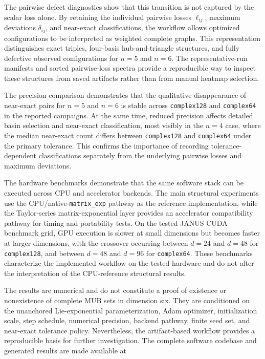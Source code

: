 \documentclass[a4paper,twocolumn,11pt,amsfonts,amssymb]{quantumarticle}
\begin{document}
The pairwise defect diagnostics show that this transition is not captured by the scalar loss alone. By retaining the individual pairwise losses \(\ell_{ij}\), maximum deviations \(\delta_{ij}\), and near-exact classifications, the workflow allows optimized configurations to be interpreted as weighted complete graphs. This representation distinguishes exact triples, four-basis hub-and-triangle structures, and fully defective observed configurations for \(n=5\) and \(n=6\). The representative-run manifests and sorted pairwise-loss spectra provide a reproducible way to inspect these structures from saved artifacts rather than from manual heatmap selection.

The precision comparison demonstrates that the qualitative disappearance of near-exact pairs for \(n=5\) and \(n=6\) is stable across \texttt{complex128} and \texttt{complex64} in the reported campaigns. At the same time, reduced precision affects detailed basin selection and near-exact classification, most visibly in the \(n=4\) case, where the median near-exact count differs between \texttt{complex128} and \texttt{complex64} under the primary tolerance. This confirms the importance of recording tolerance-dependent classifications separately from the underlying pairwise losses and maximum deviations.

The hardware benchmarks demonstrate that the same software stack can be executed across CPU and accelerator backends. The main structural experiments use the CPU/native-\texttt{matrix\_exp} pathway as the reference implementation, while the Taylor-series matrix-exponential layer provides an accelerator compatibility pathway for timing and portability tests. On the tested JANUS CUDA benchmark grid, GPU execution is slower at small dimensions but becomes faster at larger dimensions, with the crossover occurring between \(d=24\) and \(d=48\) for \texttt{complex128}, and between \(d=48\) and \(d=96\) for \texttt{complex64}. These benchmarks characterize the implemented workflow on the tested hardware and do not alter the interpretation of the CPU-reference structural results.

The results are numerical and do not constitute a proof of existence or nonexistence of complete MUB sets in dimension six. They are conditioned on the unanchored Lie-exponential parameterization, Adam optimizer, initialization scale, step schedule, numerical precision, backend pathway, finite seed set, and near-exact tolerance policy. Nevertheless, the artifact-based workflow provides a reproducible basis for further investigation. The complete software codebase and generated results are made available at
\end{document}
